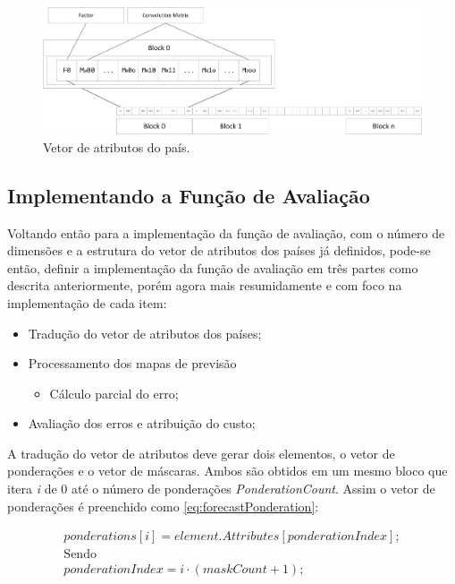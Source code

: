 \begin{figure}[h]
	\centering	\includegraphics[scale=0.49]{Figuras/VetorAtributosForecast-Ingles.png}
	\caption{Vetor de atributos do país.}
	\label{fig:VetorAtributosForecast-Ingles}
\end{figure}


\subsection{Implementando a Função de Avaliação}
\label{Implementando a Função de Avaliação}

Voltando então para a implementação da função de avaliação, com o número de dimensões e a estrutura do vetor de atributos dos países já definidos, pode-se então, definir a implementação da função de avaliação em três partes como descrita anteriormente, porém agora mais resumidamente e com foco na implementação de cada item:

\begin{itemize}
\item Tradução do vetor de atributos dos países;
\item Processamento dos mapas de previsão 
\begin{itemize}
\item Cálculo parcial do erro;
\end{itemize}
\item Avaliação dos erros e atribuição do custo;
\end{itemize}

A tradução do vetor de atributos deve gerar dois elementos, o vetor de ponderações e o vetor de máscaras. Ambos são obtidos em um mesmo bloco que itera \emph{i} de 0 até o número de ponderações \emph{PonderationCount}. Assim o vetor de ponderações é preenchido como \ref{eq:forecastPonderation}:
	
\begin{equation}
\label{eq:forecastPonderation}
\begin{split}
ponderations[i] = element.Attributes[ponderationIndex];\\
\text{Sendo}\\
ponderationIndex = i \cdot (maskCount + 1);
\end{split}
\end{equation}


